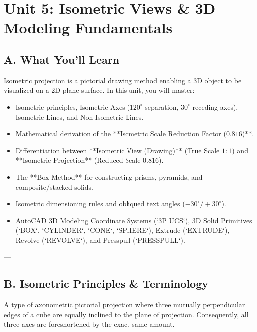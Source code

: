 \chapter{Unit 5: Isometric Views \& 3D Modeling Fundamentals}

\section{A. What You'll Learn}
Isometric projection is a pictorial drawing method enabling a 3D object to be visualized on a 2D plane surface. In this unit, you will master:
\begin{itemize}
    \item Isometric principles, Isometric Axes ($120^\circ$ separation, $30^\circ$ receding axes), Isometric Lines, and Non-Isometric Lines.
    \item Mathematical derivation of the **Isometric Scale Reduction Factor ($0.816$)**.
    \item Differentiation between **Isometric View (Drawing)** (True Scale $1:1$) and **Isometric Projection** (Reduced Scale $0.816$).
    \item The **Box Method** for constructing prisms, pyramids, and composite/stacked solids.
    \item Isometric dimensioning rules and obliqued text angles ($-30^\circ / +30^\circ$).
    \item AutoCAD 3D Modeling Coordinate Systems (`3P UCS`), 3D Solid Primitives (`BOX`, `CYLINDER`, `CONE`, `SPHERE`), Extrude (`EXTRUDE`), Revolve (`REVOLVE`), and Presspull (`PRESSPULL`).
\end{itemize}

---

\section{B. Isometric Principles \& Terminology}

\begin{definition}
A type of axonometric pictorial projection where three mutually perpendicular edges of a cube are equally inclined to the plane of projection. Consequently, all three axes are foreshortened by the exact same amount.
\end{definition}

